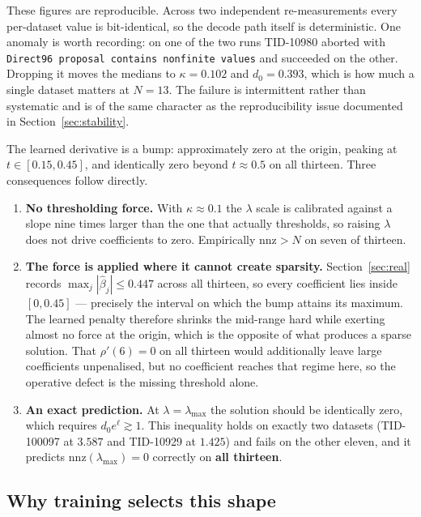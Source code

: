 \documentclass[11pt]{article}
\newcommand{\bhat}{\hat{\beta}}
\begin{document}
These figures are reproducible. Across two independent re-measurements every
per-dataset value is bit-identical, so the decode path itself is deterministic.
One anomaly is worth recording: on one of the two runs TID-10980 aborted with
\texttt{Direct96 proposal contains nonfinite values} and succeeded on the
other. Dropping it moves the medians to $\kappa = 0.102$ and $d_0 = 0.393$,
which is how much a single dataset matters at $N = 13$. The failure is
intermittent rather than systematic and is of the same character as the
reproducibility issue documented in Section~\ref{sec:stability}.

The learned derivative is a bump: approximately zero at the origin, peaking at
$t \in [0.15, 0.45]$, and identically zero beyond $t \approx 0.5$ on all
thirteen. Three consequences follow directly.

\begin{enumerate}
\itemsep2pt
\item \textbf{No thresholding force.} With $\kappa \approx 0.1$ the $\lambda$
      scale is calibrated against a slope nine times larger than the one that
      actually thresholds, so raising $\lambda$ does not drive coefficients to
      zero. Empirically $\mathrm{nnz} > N$ on seven of thirteen.
\item \textbf{The force is applied where it cannot create sparsity.}
      Section~\ref{sec:real} records $\max_j |\bhat_j| \le 0.447$ across all
      thirteen, so every coefficient lies inside $[0, 0.45]$ --- precisely the
      interval on which the bump attains its maximum. The learned penalty
      therefore shrinks the mid-range hard while exerting almost no force at
      the origin, which is the opposite of what produces a sparse solution.
      That $\rho'(6) = 0$ on all thirteen would additionally leave large
      coefficients unpenalised, but no coefficient reaches that regime here,
      so the operative defect is the missing threshold alone.
\item \textbf{An exact prediction.} At $\lambda = \lambda_{\max}$ the solution
      should be identically zero, which requires $d_0 e^{\ell} \gtrsim 1$.
      This inequality holds on exactly two datasets (TID-100097 at $3.587$ and
      TID-10929 at $1.425$) and fails on the other eleven, and it predicts
      $\mathrm{nnz}(\lambda_{\max}) = 0$ correctly on \textbf{all thirteen}.
\end{enumerate}

\subsection{Why training selects this shape}
\end{document}
